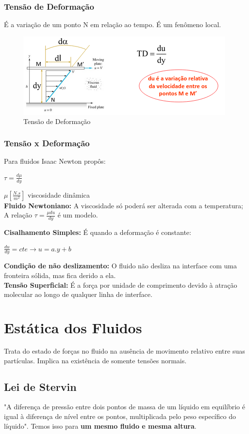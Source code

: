 \documentclass[a4paper, 12pt]{article}
\begin{document}
\subsubsection{Tensão de Deformação}
	É a variação de um ponto N em relação ao tempo.
	É um fenômeno local.
	\begin{figure}[h]
		\centering
		\includegraphics[width=0.7\linewidth]{imagens/tensao}
		\caption{Tensão de Deformação}
		\label{fig:tensao}
	\end{figure}
\subsubsection{Tensão x Deformação}
	Para fluidos Isaac Newton propôs:
	\begin{center}
		\Large
		$ \tau = \frac{d\mu}{dy} $
	\end{center}
	$\mu[\frac{N.s}{m^2}]$ viscosidade dinâmica\\
	
	\textbf{Fluido Newtoniano:} A viscosidade só poderá ser alterada com a temperatura;
	A relação $\tau = \frac{\mu du}{dy}$ é um modelo.
	
	\textbf{Cisalhamento Simples:} É quando a deformação é constante:
	\begin{center}
		\Large
		$
		\frac{du}{dy} = cte \rightarrow u = a.y+b
		$
	\end{center}

	\textbf{Condição de não deslizamento:} O fluido não desliza na interface com uma fronteira sólida, mas fica derido a ela.\\
	
	\textbf{Tensão Superficial:} É a força por unidade de comprimento devido à atração molecular ao longo de qualquer linha de interface.
	
\newpage
\section{Estática dos Fluidos}
	Trata do estado de forças no fluido na ausência de movimento relativo entre suas partículas.
	Implica na existência de somente tensões normais.
\subsection{Lei de Stervin}
	"A diferença de pressão entre dois pontos de massa de um líquido em equilíbrio é igual à diferença de nível entre os pontos, multiplicada pelo peso específico do líquido". Temos isso para \textbf{um mesmo fluido e mesma altura}.\\
	
\end{document}
